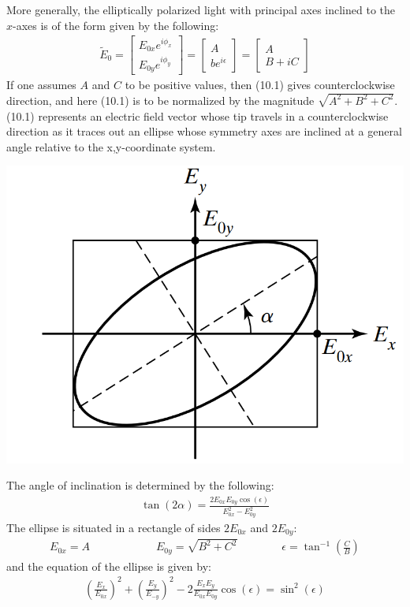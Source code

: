 \documentclass[11pt]{book}
\theoremstyle{break}
\theoremstyle{break}
\newcommand{\that}[1]{\widetilde{#1}}
\newcommand{\bmat}[1]{\begin{bmatrix} #1 \end{bmatrix}}
\begin{document}
More generally, the elliptically polarized light with principal axes inclined to the $x$-axes is of the form given by the following:
\begin{align}
\that{E}_0 = \bmat{E_{0x}e^{i\phi_x} \\ E_{0y}e^{i\phi_y}} = \bmat{A \\ b e^{i\epsilon}} = \bmat{A \\ B + iC}
\end{align}
If one assumes $A$ and $C$ to be positive values, then (10.1) gives counterclockwise direction, and here (10.1) is to be normalized by the magnitude $\sqrt{A^2+B^2 + C^2}$. (10.1) represents an electric field vector whose tip travels in a counterclockwise direction as it traces out an ellipse whose symmetry axes are inclined at a general angle relative to the x,y-coordinate system. 
\begin{center}
\includegraphics[scale=0.35]{ellipse}
\end{center}

The angle of inclination is determined by the following:
\begin{align*}
\tan(2\alpha) = \frac{2E_{0x}E_{0y}\cos(\epsilon)}{E_{0x}^2-E_{0y}^2}
\end{align*}
The ellipse is situated in a rectangle of sides $2E_{0x}$ and $2E_{0y}$:
\begin{align*}
E_{0x} = A \qquad \qquad \qquad E_{0y} = \sqrt{B^2 + C^2} \qquad\qquad \epsilon = \tan^{-1}\left( \frac{C}{B}\right)
\end{align*}
and the equation of the ellipse is given by:
\begin{align*}
\left( \frac{E_{x}}{E_{0x}}\right)^2 + \left( \frac{E_y}{E_{-y}}\right)^2 - 2\frac{E_x E_y}{E_{0x}E_{0y}}\cos(\epsilon) = \sin^2(\epsilon)
\end{align*}
\newpage
\end{document}
